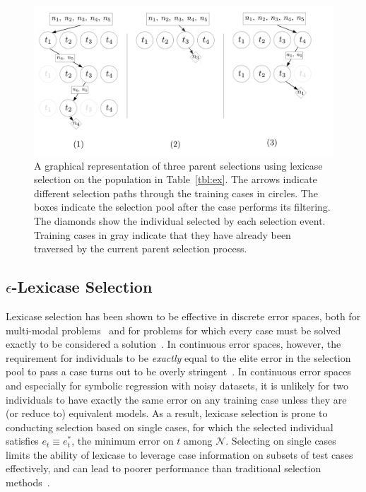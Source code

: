 \documentclass[twoside]{article}
\begin{document}
\begin{figure}[tb]
\centering
  \includegraphics[height = 0.3\textheight]{figs/lex_graph_v3.pdf}
  \caption{A graphical representation of three parent selections using lexicase selection on the population in Table~\ref{tbl:ex}. The arrows indicate different selection paths through the training cases in circles. The boxes indicate the selection pool after the case performs its filtering. The diamonds show the individual selected by each selection event. Training cases in gray indicate that they have already been traversed by the current parent selection process.}\label{fig:lex_graph}
\end{figure}

\subsection{{\large $\epsilon$}-Lexicase Selection}\label{s:eplex}

Lexicase selection has been shown to be effective in discrete error spaces, both for multi-modal problems~\citep{spector_assessment_2012} and for problems for which every case must be solved exactly to be considered a solution~\citep{helmuth_solving_2014, helmuth_general_2015-1}. In continuous error spaces, however, the requirement for individuals to be {\it exactly} equal to the elite error in the selection pool to pass a case turns out to be overly stringent~\citep{la_cava_epsilon-lexicase_2016}. In continuous error spaces and especially for symbolic regression with noisy datasets, it is unlikely for two individuals to have exactly the same error on any training case unless they are (or reduce to) equivalent models. As a result, lexicase selection is prone to conducting selection based on single cases, for which the selected individual satisfies $e_t \equiv e^*_t$, the minimum error on $t$ among $\mathcal{N}$. Selecting on single cases limits the ability of lexicase to leverage case information on subsets of test cases effectively, and can lead to poorer performance than traditional selection methods~\citep{la_cava_epsilon-lexicase_2016}. 
\end{document}
